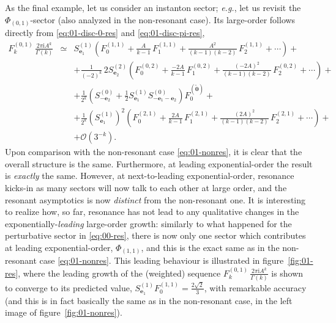 \documentclass[11pt,a4paper]{article}
\begin{document}
As the final example, let us consider an instanton sector; \textit{e.g.}, let us revisit the $\Phi_{(0,1)}$-sector (also analyzed in the non-resonant case). Its large-order follows directly from \eqref{eq:01-disc-0-res} and \eqref{eq:01-disc-pi-res},
%
\begin{eqnarray}
\label{eq:01-res}
F_k^{(0,1)}\, \frac{2\pi\mathrm{i} A^k}{\Gamma(k)} &\simeq& S^{(1)}_{\boldsymbol{e}_1} \left( F^{(1,1)}_0 + \frac{A}{k-1}\, F^{(1,1)}_1 + \frac{A^2}{(k-1)(k-2)}\, F^{(1,1)}_2 + \cdots \right) + \\
&&
+ \frac{1}{(-2)^k}\, 2 S^{(2)}_{\boldsymbol{e}_2} \left( F^{(0,2)}_0 + \frac{-2A}{k-1}\, F^{(0,2)}_1 + \frac{(-2A)^2}{(k-1)(k-2)}\, F^{(0,2)}_2 + \cdots \right) + \nonumber \\
&&
+ \frac{1}{2^k} \left( S^{(0)}_{-\boldsymbol{e}_2} + \frac{1}{2} S^{(1)}_{\boldsymbol{e}_1} S^{(0)}_{-\boldsymbol{e}_1-\boldsymbol{e}_2} \right) F_0^{(\widetilde{\boldsymbol{0}})} + \nonumber \\
&&
+ \frac{1}{2^k} \left( S^{(1)}_{\boldsymbol{e}_1} \right)^2 \left( F^{(2,1)}_0 + \frac{2A}{k-1}\, F^{(2,1)}_1 + \frac{(2A)^2}{(k-1)(k-2)}\, F^{(2,1)}_2 + \cdots \right) + \nonumber \\
&&
+ \mathcal{O}( 3^{-k}). \nonumber
\end{eqnarray} 
%
\noindent
Upon comparison with the non-resonant case \eqref{eq:01-nonres}, it is clear that the overall structure is the same. Furthermore, at leading exponential-order the result is \textit{exactly} the same. However, at next-to-leading exponential-order, resonance kicks-in as many sectors will now talk to each other at large order, and the resonant asymptotics is now \textit{distinct} from the non-resonant one. It is interesting to realize how, so far, resonance has not lead to any qualitative changes in the exponentially-\textit{leading} large-order growth: similarly to what happened for the perturbative sector in \eqref{eq:00-res}, there is now only one sector which contributes at leading exponential-order, $\Phi_{(1,1)}$, and this is the exact same as in the non-resonant case \eqref{eq:01-nonres}. This leading behaviour is illustrated in figure~\ref{fig:01-res}, where the leading growth of the (weighted) sequence $F_k^{(0,1)}\, \frac{2\pi\mathrm{i} A^k}{\Gamma(k)}$ is shown to converge to its predicted value, $S^{(1)}_{\boldsymbol{e}_1} F^{(1,1)}_0 = \frac{2\sqrt{2}}{3}$, with remarkable accuracy (and this is in fact basically the same as in the non-resonant case, in the left image of figure~\ref{fig:01-nonres}). 
\end{document}
